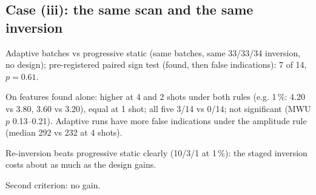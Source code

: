 \subsection{Case (iii): the same scan and the same inversion}\label{sec:case-iii}
\begin{notes}
\item Adaptive batches vs progressive static (same batches, same 33/33/34 inversion, no design); pre-registered paired sign test (found, then false indications): 7 of 14, $p=0.61$.
\item On features found alone: higher at 4 and 2 shots under both rules (e.g. 1\,\%: 4.20 vs 3.80, 3.60 vs 3.20), equal at 1 shot; all five 3/14 vs 0/14; not significant (MWU $p$ 0.13--0.21). Adaptive runs have more false indications under the amplitude rule (median 292 vs 232 at 4 shots).
\item Re-inversion beats progressive static clearly (10/3/1 at 1\,\%): the staged inversion costs about as much as the design gains.
\item Second criterion: no gain.
\end{notes}
